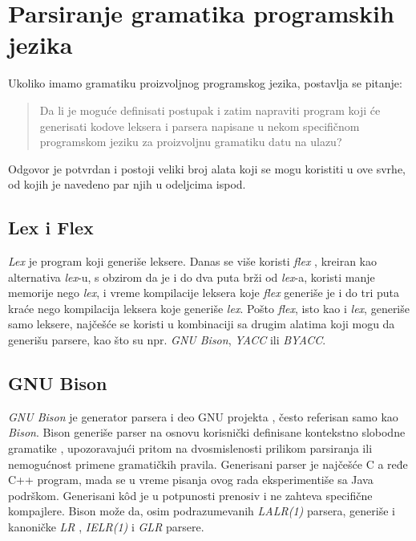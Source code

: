 \section{Parsiranje gramatika programskih jezika}
\label{sec:ParsingGrammars}

Ukoliko imamo gramatiku proizvoljnog programskog jezika, postavlja se pitanje: 
\begin{quote}
    Da li je moguće definisati postupak i zatim napraviti program koji će generisati kodove leksera i parsera napisane u nekom specifičnom programskom jeziku za proizvoljnu gramatiku datu na ulazu?
\end{quote}
Odgovor je potvrdan i postoji veliki broj alata koji se mogu koristiti u ove svrhe, od kojih je navedeno par njih u odeljcima ispod.

\subsection{Lex i Flex}
\label{subsec:LexFlex}
\emph{Lex} \cite{LexYacc} je program koji generiše leksere. Danas se više koristi \emph{flex} \cite{Flex}, kreiran kao alternativa \emph{lex}-u, s obzirom da je i do dva puta brži od \emph{lex}-a, koristi manje memorije nego \emph{lex}, i vreme kompilacije leksera koje \emph{flex} generiše je i do tri puta kraće nego kompilacija leksera koje generiše \emph{lex}. Pošto \emph{flex}, isto kao i \emph{lex}, generiše samo leksere, najčešće se koristi u kombinaciji sa drugim alatima koji mogu da generišu parsere, kao što su npr. \emph{GNU Bison}, \emph{YACC} ili \emph{BYACC}.

\subsection{GNU Bison}
\label{subsec:GNUBison}
\emph{GNU Bison} \cite{GNUBison} je generator parsera i deo GNU projekta \cite{GNUProject}, često referisan samo kao \emph{Bison}. Bison generiše parser na osnovu korisnički definisane kontekstno slobodne gramatike \cite{ContextFreeGrammars}, upozoravajući pritom na dvosmislenosti prilikom parsiranja ili nemogućnost primene gramatičkih pravila. Generisani parser je najčešće C a ređe C++ program, mada se u vreme pisanja ovog rada eksperimentiše sa Java podrškom. Generisani k\^od je u potpunosti prenosiv i ne zahteva specifične kompajlere. Bison može da, osim podrazumevanih \emph{LALR(1)} \cite{LALR1} parsera, generiše i kanoničke \emph{LR} \cite{LR}, \emph{IELR(1)} \cite{IELR1} i \emph{GLR} \cite{GLR} parsere.

